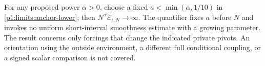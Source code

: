 For any proposed power $\alpha>0$, choose a fixed
$a<\min(\alpha,1/10)$ in
\eqref{p1:limits:anchor-lower}; then
$N^\alpha\mathcal E_{\iota,N}\to\infty$.
The quantifier fixes $a$ before $N$ and invokes no
uniform short-interval smoothness estimate with a growing
parameter.  The result concerns only forcings that change
the indicated private pivots.  An orientation using the
outside environment, a different full conditional coupling,
or a signed scalar comparison is not covered.

